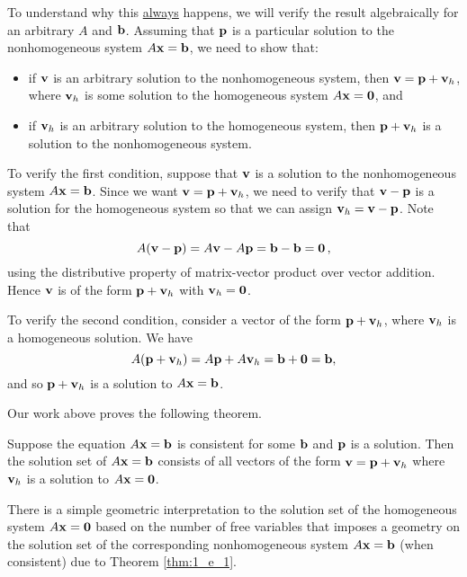\vspace{0.2cm}

To understand why this \underline{always} happens, we will verify the result algebraically for an arbitrary $A$ and $\mathbf{b}$. Assuming that $\mathbf{p}$ is a particular solution to the nonhomogeneous system $A\mathbf{x}=\mathbf{b}$, we need to show that:
\begin{itemize}
\item if $\mathbf{v}$ is an arbitrary solution to the nonhomogeneous system, then $\mathbf{v} = \mathbf{p} + \mathbf{v}_h$, where $\mathbf{v}_h$ is some solution to the homogeneous system $A\mathbf{x} = \mathbf{0}$, and
\item if $\mathbf{v}_h$ is an arbitrary solution to the homogeneous system, then $\mathbf{p} + \mathbf{v}_h$ is a solution to the nonhomogeneous system.
\end{itemize}

To verify the first condition, suppose that $\mathbf{v}$ is a solution to the nonhomogeneous system $A \mathbf{x} = \mathbf{b}$. Since we want $\mathbf{v}=\mathbf{p}+\mathbf{v}_h$, we need to verify that $\mathbf{v}-\mathbf{p}$ is a solution for the homogeneous system so that we can assign $\mathbf{v}_h=\mathbf{v}-\mathbf{p}$. Note that
\[A(\mathbf{v} - \mathbf{p}) = A\mathbf{v} - A\mathbf{p} = \mathbf{b} - \mathbf{b} = \mathbf{0} \, ,\]
using the distributive property of matrix-vector product over vector addition. Hence $\mathbf{v}$ is of the form $\mathbf{p} + \mathbf{v}_h$ with $\mathbf{v}_h = \mathbf{0}$.

To verify the second condition, consider a vector of the form $\mathbf{p} + \mathbf{v}_h$, where $\mathbf{v}_h$ is a homogeneous solution. We have
\[A(\mathbf{p} + \mathbf{v}_h) = A\mathbf{p} + A\mathbf{v}_h = \mathbf{b} + \mathbf{0} = \mathbf{b},\]
and so $\mathbf{p} + \mathbf{v}_h$ is a solution to $A \mathbf{x} = \mathbf{b}$.



Our work above proves the following theorem.

\begin{theorem} \label{thm:1_e_1} Suppose the equation $A\mathbf{x}=\mathbf{b}$ is consistent for some $\mathbf{b}$ and $\mathbf{p}$ is a solution. Then the solution set of $A\mathbf{x}=\mathbf{b}$ consists of all vectors of the form $\mathbf{v}=\mathbf{p}+\mathbf{v}_h$ where $\mathbf{v}_h$ is a solution to $A\mathbf{x}=\mathbf{0}$.
\end{theorem}


\label{sec:geom_homog_sys}

There is a simple geometric interpretation to the solution set of the homogeneous system $A \mathbf{x} = \mathbf{0}$ based on the number of free variables that imposes a geometry on the solution set of the corresponding nonhomogeneous system $A \mathbf{x} = \mathbf{b}$ (when consistent) due to Theorem \ref{thm:1_e_1}.



